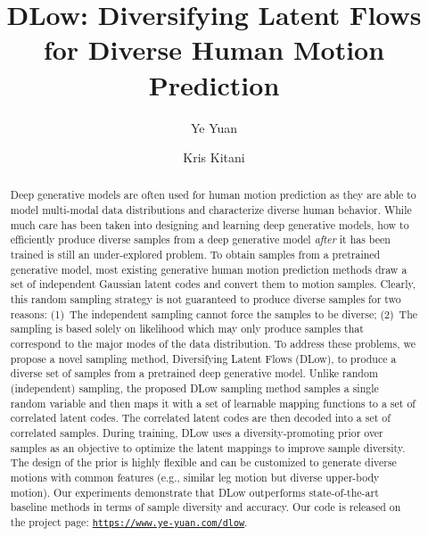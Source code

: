 \documentclass[runningheads]{llncs}
\begin{document}
	\pagestyle{headings}
	\mainmatter
	\def\ECCVSubNumber{794}  

	\title{DLow: Diversifying Latent Flows for Diverse Human Motion Prediction} 

	
	
	\author{Ye Yuan \and Kris Kitani}
	\maketitle
	\vspace{-4mm}
	
	\begin{abstract}
		Deep generative models are often used for human motion prediction as they are able to model multi-modal data distributions and characterize diverse human behavior. While much care has been taken into designing and learning deep generative models, how to efficiently produce diverse samples from a deep generative model \emph{after} it has been trained is still an under-explored problem. To obtain samples from a pretrained generative model, most existing generative human motion prediction methods draw a set of independent Gaussian latent codes and convert them to motion samples. Clearly, this random sampling strategy is not guaranteed to produce diverse samples for two reasons: (1)~The independent sampling cannot force the samples to be diverse; (2)~The sampling is based solely on likelihood which may only produce samples that correspond to the major modes of the data distribution. To address these problems, we propose a novel sampling method, Diversifying Latent Flows (DLow), to produce a diverse set of samples from a pretrained deep generative model. Unlike random (independent) sampling, the proposed DLow sampling method samples a single random variable and then maps it with a set of learnable mapping functions to a set of correlated latent codes. The correlated latent codes are then decoded into a set of correlated samples. During training, DLow uses a diversity-promoting prior over samples as an objective to optimize the latent mappings to improve sample diversity. The design of the prior is highly flexible and can be customized to generate diverse motions with common features (e.g., similar leg motion but diverse upper-body motion). Our experiments demonstrate that DLow outperforms state-of-the-art baseline methods in terms of sample diversity and accuracy. Our code is released on the project page: \href{https://www.ye-yuan.com/dlow}{\texttt{https://www.ye-yuan.com/dlow}}.
		\vspace{-3mm}
	\end{abstract}
	\vspace{-9mm}
	
\end{document}
